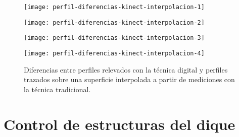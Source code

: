 \begin{figure}[ht]
\centering
\begin{minipage}[h]{.45\textwidth}
\begin{center}
\texttt{[image: perfil-diferencias-kinect-interpolacion-1]}
\end{center}
\end{minipage}
\hfill
\begin{minipage}[h]{.45\textwidth}
\begin{center}
\texttt{[image: perfil-diferencias-kinect-interpolacion-2]}
\end{center}
\end{minipage}
\hfill
\begin{minipage}[h]{.45\textwidth}
\begin{center}
\texttt{[image: perfil-diferencias-kinect-interpolacion-3]}
\end{center}
\end{minipage}
\hfill
\begin{minipage}[h]{.45\textwidth}
\begin{center}
\texttt{[image: perfil-diferencias-kinect-interpolacion-4]}
\end{center}
\end{minipage}
\hfill
\caption[Diferencias entre perfiles con Kinect y perfiles extraídos desde superficie interpolada]
{Diferencias entre perfiles relevados con la técnica digital y perfiles trazados sobre una superficie interpolada a partir de mediciones con la técnica tradicional.}
\label{fig:perfiles-diferencia-kinect-interpolacion}
\end{figure}

\section{Control de estructuras del dique}

